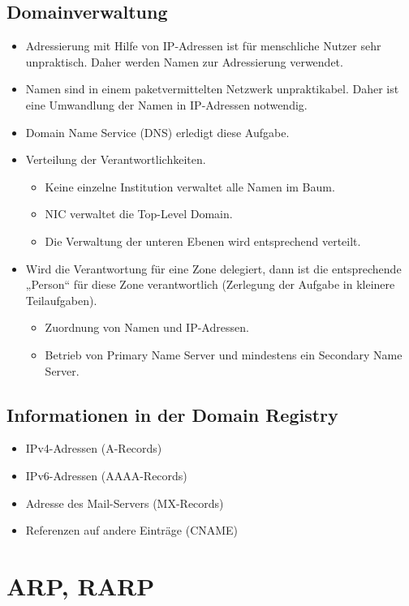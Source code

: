 \documentclass{article} %
\begin{document}
\subsection{Domainverwaltung}
\begin{itemize}
	\item Adressierung mit Hilfe von IP-Adressen ist für menschliche Nutzer sehr unpraktisch. Daher werden Namen zur Adressierung verwendet.
	\item Namen sind in einem paketvermittelten Netzwerk unpraktikabel. Daher ist eine Umwandlung der Namen in IP-Adressen notwendig.
	\item Domain Name Service (DNS) erledigt diese Aufgabe.
	\item Verteilung der Verantwortlichkeiten.
	\begin{itemize}
		\item Keine einzelne Institution verwaltet alle Namen im Baum.
		\item NIC verwaltet die Top-Level Domain.
		\item Die Verwaltung der unteren Ebenen wird entsprechend verteilt.
	\end{itemize}
	\item Wird die Verantwortung für eine Zone delegiert, dann ist die entsprechende „Person“ für diese Zone verantwortlich (Zerlegung der Aufgabe in kleinere Teilaufgaben).
	\begin{itemize}
		\item Zuordnung von Namen und IP-Adressen.
		\item Betrieb von Primary Name Server und mindestens ein Secondary Name Server.
	\end{itemize}
\end{itemize}
\subsection{Informationen in der Domain Registry}
\begin{itemize}
	\item IPv4-Adressen (A-Records)
	\item IPv6-Adressen (AAAA-Records)
	\item Adresse des Mail-Servers (MX-Records)
	\item Referenzen auf andere Einträge (CNAME)
\end{itemize}

\section{ARP, RARP}
\end{document}
